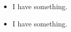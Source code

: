 \documentclass{article}
\newcommand{\resumeItemListStart}{\begin{itemize}}
\newcommand{\resumeItemListEnd}{\end{itemize}\vspace{0pt}}
\newcommand{\resumeItem}[1]{
  \item{
    {#1 \vspace{-1pt}}
  }
}
\begin{document}
\resumeItemListStart
\resumeItem{I have something.}
\resumeItem{I have something.}
\resumeItemListEnd
\end{document}
